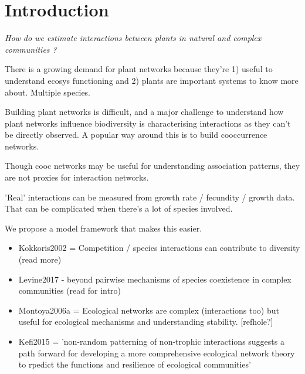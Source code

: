 \documentclass[a4,12pt]{article}
\begin{document}
    


    \section{Introduction}

    \textit{How do we estimate interactions between plants in natural and complex communities ?}

    There is a growing demand for plant networks because they're 1) useful to understand ecosys functioning and 2) plants are important systems to know more about. Multiple species.    

    Building plant networks is difficult, and a major challenge to understand how plant networks influence biodiversity is characterising interactions as they can't be directly observed. A popular way around this is to build cooccurrence networks. 

    Though cooc networks may be useful for understanding association patterns, they are not proxies for interaction networks. 

    'Real' interactions can be measured from growth rate / fecundity / growth data. That can be complicated when there's a lot of species involved. 

    We propose a model framework that makes this easier.
 
  

    \begin{itemize}
        \item Kokkoris2002 =  Competition / species interactions can contribute to diversity (read more)
        \item Levine2017 - beyond pairwise mechanisms of species coexistence in complex communities (read for intro)
        \item  Montoya2006a = Ecological networks are complex (interactions too) but useful for ecological mechanisms and understanding stability. [refhole?]
        \item Kefi2015 = 'non-random patterning of non-trophic interactions suggests a path forward for developing a more comprehensive ecological network theory to rpedict the functions and resilience of ecological communities'
    \end{itemize}
\end{document}
